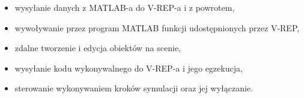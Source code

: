 \documentclass[11pt, a4paper, twoside]{article}
\begin{document}
	\begin{itemize}
		\item wysyłanie danych z MATLAB-a do V-REP-a i z powrotem,
		\item wywoływanie przez program MATLAB funkcji udostępnionych przez V-REP,
		\item zdalne tworzenie i edycja obiektów na scenie,
		\item wysyłanie kodu wykonywalnego do V-REP-a i jego egzekucja,
		\item sterowanie wykonywaniem kroków symulacji oraz jej wyłączanie.
	\end{itemize}

	
\end{document}
